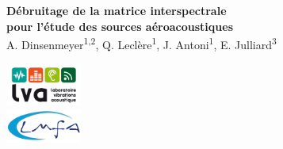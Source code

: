 \documentclass[portrait,final,a0paper]{baposter}
\begin{document}
\begin{poster}
{\begin{minipage}{3cm}
\end{minipage}
  }
 {
 \textcolor{main}{\textbf{ Débruitage de la matrice interspectrale \\ pour l'étude des sources aéroacoustiques}}}
  { ~\\A. Dinsenmeyer\textsuperscript{1,2}, Q. Leclère\textsuperscript{1}, J. Antoni\textsuperscript{1}, E. Julliard\textsuperscript{3}}
  {
\begin{minipage}{3cm}
\centering
 \includegraphics[width=2.5cm]{logo/LVA_compact_couleur.jpg}\\
 \includegraphics[width=2.5cm]{logo/logo_lmfa.pdf} \\~\\
\end{minipage}
  }
  
 




\end{poster}
\end{document}
